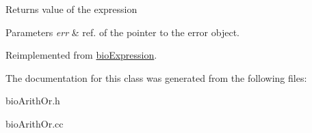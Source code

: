\begin{DoxyReturn}{Returns}
value of the expression 
\end{DoxyReturn}

\begin{DoxyParams}{Parameters}
{\em err} & ref. of the pointer to the error object. \\
\hline
\end{DoxyParams}


Reimplemented from \hyperlink{classbio_expression_af58662a5d4d456f15bc4f2c9bd4f8a5b}{bio\+Expression}.



The documentation for this class was generated from the following files\+:\begin{DoxyCompactItemize}
\item 
bio\+Arith\+Or.\+h\item 
bio\+Arith\+Or.\+cc\end{DoxyCompactItemize}

